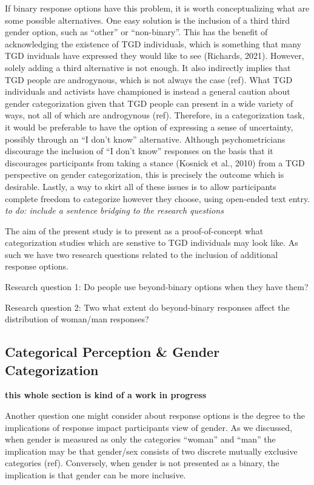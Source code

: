 \documentclass[
  man]{apa7}
\begin{document}
If binary response options have this problem, it is worth conceptualizing what are some possible alternatives. One easy solution is the inclusion of a third third gender option, such as ``other'' or ``non-binary''. This has the benefit of acknowledging the existence of TGD individuals, which is something that many TGD inviduals have expressed they would like to see (Richards, 2021). However, solely adding a third alternative is not enough. It also indirectly implies that TGD people are androgynous, which is not always the case (ref). What TGD individuals and activists have championed is instead a general caution about gender categorization given that TGD people can present in a wide variety of ways, not all of which are androgynous (ref). Therefore, in a categorization task, it would be preferable to have the option of expressing a sense of uncertainty, possibly through an ``I don't know'' alternative. Although psychometricians discourage the inclusion of ``I don't know'' responses on the basis that it discourages participants from taking a stance (Kosnick et al., 2010) from a TGD perspective on gender categorization, this is precisely the outcome which is desirable. Lastly, a way to skirt all of these issues is to allow participants complete freedom to categorize however they choose, using open-ended text entry. \emph{to do: include a sentence bridging to the research questions}

The aim of the present study is to present as a proof-of-concept what categorization studies which are senstive to TGD individuals may look like. As such we have two research questions related to the inclusion of additional response options.

Research question 1: Do people use beyond-binary options when they have them?

Research question 2: Two what extent do beyond-binary responses affect the distribution of woman/man responses?

\hypertarget{categorical-perception-gender-categorization}{%
\subsection{Categorical Perception \& Gender Categorization}\label{categorical-perception-gender-categorization}}

\textbf{this whole section is kind of a work in progress}

Another question one might consider about response options is the degree to the implications of response impact participants view of gender. As we discussed, when gender is measured as only the categories ``woman'' and ``man'' the implication may be that gender/sex consists of two discrete mutually exclusive categories (ref). Conversely, when gender is not presented as a binary, the implication is that gender can be more inclusive.
\end{document}
